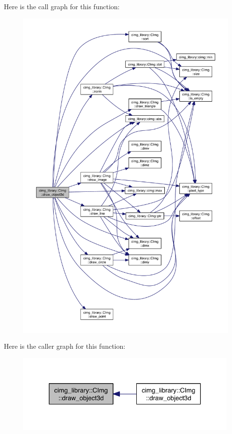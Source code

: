 Here is the call graph for this function\-:
\nopagebreak
\begin{figure}[H]
\begin{center}
\leavevmode
\includegraphics[width=350pt]{structcimg__library_1_1_c_img_ae1fe96df1ca8aaf7165b2e66fe798839_cgraph}
\end{center}
\end{figure}




Here is the caller graph for this function\-:
\nopagebreak
\begin{figure}[H]
\begin{center}
\leavevmode
\includegraphics[width=316pt]{structcimg__library_1_1_c_img_ae1fe96df1ca8aaf7165b2e66fe798839_icgraph}
\end{center}
\end{figure}


